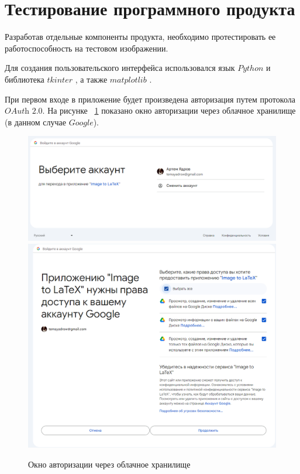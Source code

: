\section{Тестирование программного продукта}

Разработав отдельные компоненты продукта, необходимо протестировать ее работоспособность на тестовом изображении.

Для создания пользовательского интерфейса использовался язык $Python$ и библиотека $tkinter$ \cite{tkinter}, а также $matplotlib$ \cite{matplot}.

При первом входе в приложение будет произведена авторизация путем протокола $\textit{OAuth 2.0}$. На рисунке ~\ref{auth_window} показано окно авторизации через облачное хранилище (в данном случае $Google$).

\begin{figure}
    \includegraphics[scale=0.5]{img/app/oauth_1.png}
    \includegraphics[scale=0.3]{img/app/oauth_2.png}
    \caption{Окно авторизации через облачное хранилище}
    \label{auth_window}
\end{figure}


